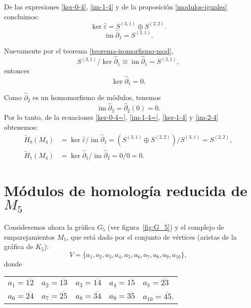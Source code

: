 \documentclass[12pt]{book}
\theoremstyle{definition}
\DeclareMathOperator{\im}{im}
\newcounter{in}
\begin{document}
De las expresiones \ref{ker-0-4}, \ref{im-1-4} y de la
proposición \ref{modulos-iguales} concluimos:
\begin{equation}
  \label{ker-0-4=}
  \ker\widehat\varepsilon=S^{(3,1)}\oplus S^{(2,2)}.
\end{equation}
\begin{equation}
\label{im-1-4=}
\im\widehat\partial_{1}=S^{(3,1)}.
\end{equation}

Nuevamente por el teorema \ref{teorema-isomorfismo-mod},
$$S^{(3,1)}/\ker\widehat\partial_{1}\cong\im\widehat\partial_{1}= S^{(3,1)},$$
entonces
\begin{equation}
  \ker\widehat\partial_{1}=0.
  \label{ker-1-4}
\end{equation}

Como $\widehat\partial_{2}$ es un homomorfismo de módulos, tenemos
\begin{equation}
  \im\widehat\partial_{2}=\widehat\partial_{2}(0)=0.
  \label{im-2-4}
\end{equation}
Por lo tanto, de la ecuaciones \ref{ker-0-4=}, \ref{im-1-4=},
\ref{ker-1-4} y \ref{im-2-4} obtenemos:
\begin{align*}
\widetilde H_{0}(M_{4})&=\ker \widehat\varepsilon/\im
\widehat\partial_{1}=(S^{(3,1)}\oplus S^{(2,2)})/S^{(3,1)}=S^{(2,2)},\\
\widetilde H_{1}(M_{4})&=\ker \widehat\partial_{1}/\im \widehat\partial_{2}=0/0=0.
\end{align*}

\section{Módulos de homología reducida de $M_{5}$}
\label{hom-red-M5}

Consideremos ahora la gráfica $G_{5}$ (ver figura~\ref{fig:G_5}) y el complejo de emparejamientos $M_{5}$, que
está dado por el conjunto de vértices (aristas de la gráfica de $K_{5}$):
$$V=\{a_{1},a_{2},a_{3},a_{4},a_{5},a_{6},a_{7},a_{8},a_{9},a_{10}\},$$
donde
\begin{table}[!hbtp]
  \centering
  \begin{tabular}{lllll}
    $a_{1}=\overline{12}$ & $a_{2}=\overline{13}$ & $a_{3}=\overline{14}$ & $a_{4}=\overline{15}$ & $a_{5}=\overline{23}$ \\
    $a_{6}=\overline{24}$ & $a_{7}=\overline{25}$ & $a_{8}=\overline{34}$ & $a_{9}=\overline{35}$ & $a_{10}=\overline{45}$.
  \end{tabular}
\end{table}
\end{document}
